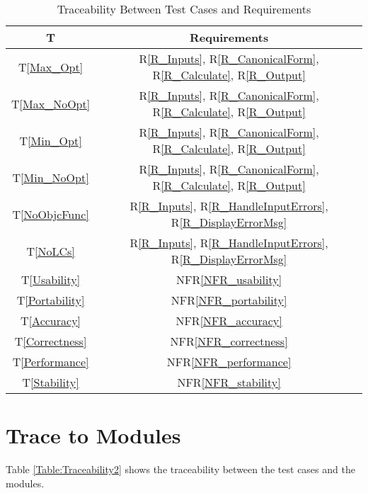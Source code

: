\documentclass[12pt, titlepage]{article}
\begin{document}
\begin{table} [h!]
	\centering
	\begin{tabular}{|c|c|}
		\hline	
		\textbf{T} & \textbf{Requirements}\\
		\hline 
		T\ref{Max_Opt}& R\ref{R_Inputs}, R\ref{R_CanonicalForm}, 
		R\ref{R_Calculate}, R\ref{R_Output}\\ \hline
		T\ref{Max_NoOpt}& R\ref{R_Inputs}, R\ref{R_CanonicalForm}, 
		R\ref{R_Calculate}, R\ref{R_Output}\\ \hline
		T\ref{Min_Opt}& R\ref{R_Inputs}, R\ref{R_CanonicalForm}, 
		R\ref{R_Calculate}, R\ref{R_Output}\\ \hline
		T\ref{Min_NoOpt}& R\ref{R_Inputs}, R\ref{R_CanonicalForm}, 
		R\ref{R_Calculate}, R\ref{R_Output}\\ \hline
		T\ref{NoObjcFunc}& R\ref{R_Inputs}, R\ref{R_HandleInputErrors}, 
						 R\ref{R_DisplayErrorMsg}\\ \hline
		T\ref{NoLCs}& R\ref{R_Inputs}, R\ref{R_HandleInputErrors}, 
					  R\ref{R_DisplayErrorMsg}\\ \hline
		T\ref{Usability}& NFR\ref{NFR_usability}\\ \hline
		T\ref{Portability}& NFR\ref{NFR_portability}\\ \hline
		T\ref{Accuracy}& NFR\ref{NFR_accuracy}\\ \hline
		T\ref{Correctness}& NFR\ref{NFR_correctness}\\ \hline
		T\ref{Performance}& NFR\ref{NFR_performance}\\ \hline
		T\ref{Stability}& NFR\ref{NFR_stability}\\ \hline
	\end{tabular}
	\caption{Traceability Between Test Cases and Requirements}
	\label{Table:Traceability} 
\end{table}
		
\section{Trace to Modules} \label{ModTrace}	

Table \ref{Table:Traceability2} shows the traceability between the test cases 
and the modules. \\
\end{document}
